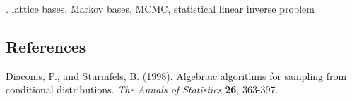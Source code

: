 \documentclass[12pt]{article}
\begin{document}
\vskip 2mm

.
lattice bases, Markov bases, MCMC, statistical linear inverse problem

%        
%
%        

\subsection*{References}

\begin{description}
\item
Diaconis, P., and Sturmfels, B. (1998). Algebraic algorithms for sampling from conditional distributions.
\textit{The Annals of Statistics} {\bf 26}, 363-397.
\end{description}
\end{document}
